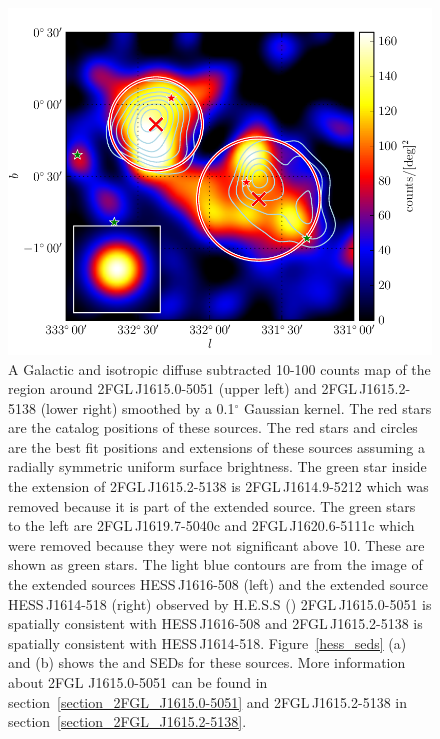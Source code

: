 \documentclass[12pt,preprint]{aastex}
\newcommand{\gev}{\text{GeV}\xspace}
\newcommand{\tev}{\text{TeV}\xspace}
\renewcommand{\deg}{\ensuremath{^\circ}\xspace}
\begin{document}
\begin{figure}
  \begin{center}
    \includegraphics[type=pdf,ext=.pdf,read=.pdf]{source_plots/source_1FGL_J1613.6-5100c}
  \end{center}
  \caption{
    A Galactic and isotropic diffuse subtracted 10-100
    \gev counts map of the region around 2FGL\,J1615.0-5051 (upper
    left) and 2FGL\,J1615.2-5138 (lower right) smoothed by a 0.1\deg
    Gaussian kernel.  The red stars are the catalog positions of these
    sources.  The red stars and circles are the best fit positions and
    extensions of these sources 
    assuming a radially
    symmetric uniform surface brightness.
    The green star inside the extension of 2FGL\,J1615.2-5138  is
    2FGL\,J1614.9-5212 which was removed because it is part of the
    extended source.  The green stars to the left are 2FGL\,J1619.7-5040c
    and 2FGL\,J1620.6-5111c which were removed because they were
    not significant above 10\gev. These are shown as green stars.
    The light blue
    contours are from the \tev image 
    of the extended sources
    HESS\,J1616-508 (left) and the extended source HESS\,J1614-518
    (right)
    observed by H.E.S.S
    (\cite{hess_plane_survey})
    2FGL\,J1615.0-5051 is spatially consistent with HESS\,J1616-508 and
    2FGL\,J1615.2-5138 is spatially consistent with HESS\,J1614-518.
    Figure~\ref{hess_seds} (a) and (b) shows the \gev and \tev SEDs for
    these sources.
    More information about 2FGL J1615.0-5051 can be found in
    section~\ref{section_2FGL_J1615.0-5051} and 2FGL\,J1615.2-5138 in
    section~\ref{section_2FGL_J1615.2-5138}.
  }\label{1FGL_J1613.6-5100c}
\end{figure}
\end{document}
